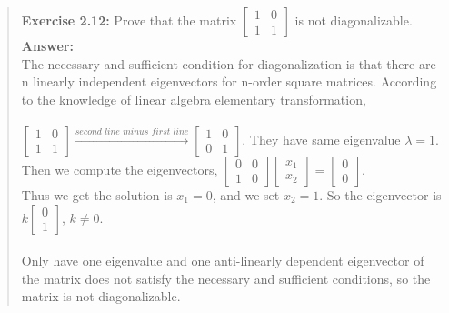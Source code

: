 \documentclass[UTF8]{ctexart}
\begin{document}
\begin{quote}
\textbf{Exercise 2.12:  } Prove that the matrix   $\begin{bmatrix}1&0\\1	&1\end{bmatrix}$ is not diagonalizable. 
	\\ 
\textbf{Answer:}\\
	The necessary and sufficient condition for diagonalization is that there are n linearly independent eigenvectors for n-order square matrices. According to the knowledge of linear algebra elementary transformation,\\ \\
	 $\begin{bmatrix}1&0\\1&1\end{bmatrix}\xrightarrow{second\,\, line \,\,minus\,\, first\,\, line} \begin{bmatrix}1&0\\0&1\end{bmatrix}$. They have same eigenvalue $\lambda=1.$\\Then we compute the eigenvectors,
	$\begin{bmatrix}0&0\\1&0\end{bmatrix}\begin{bmatrix}x_{1}\\x_{2}\end{bmatrix}
	=\begin{bmatrix}0\\0\end{bmatrix}$.\\
	Thus we get the solution is $x_{1}=0$, and we set $x_{2}=1$. So the eigenvector is $k\begin{bmatrix}0\\1\end{bmatrix}$,  $k\neq0$. \\ \\
	Only have one eigenvalue and one anti-linearly dependent eigenvector of the matrix does not satisfy the necessary and sufficient conditions, so the matrix is not diagonalizable. 
	\\
	

\end{quote}
\end{document}
